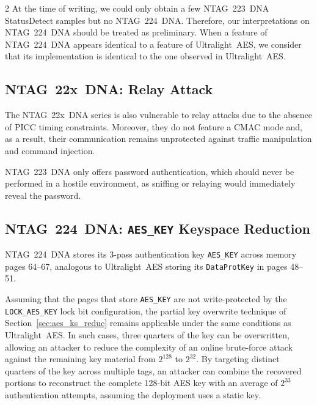 \documentclass[10pt,letterpaper]{article}
\begin{document}
\begin{multicols}{2}
At the time of writing, we could only obtain a few NTAG~223~DNA StatusDetect samples but no NTAG~224~DNA. Therefore, our interpretations on NTAG~224~DNA should be treated as preliminary. When a feature of NTAG~224~DNA appears identical to a feature of Ultralight~AES, we consider that its implementation is identical to the one observed in Ultralight~AES.

\subsection{NTAG~22x~DNA: Relay Attack}

The NTAG~22x~DNA series is also vulnerable to relay attacks due to the absence of PICC timing constraints. Moreover, they do not feature a CMAC mode and, as a result, their communication remains unprotected against traffic manipulation and command injection.

NTAG~223~DNA only offers password authentication, which should never be performed in a hostile environment, as sniffing or relaying would immediately reveal the password.

\subsection{NTAG~224~DNA: \texttt{AES\_KEY} Keyspace Reduction}

NTAG~224~DNA stores its 3-pass authentication key \texttt{AES\_KEY} across memory pages 64--67, analogous to Ultralight~AES storing its \texttt{DataProtKey} in pages 48--51.

Assuming that the pages that store \texttt{AES\_KEY} are not write-protected by the \texttt{LOCK\_AES\_KEY} lock bit configuration, the partial key overwrite technique of Section~\ref{sec:aes_ks_reduc} remains applicable under the same conditions as Ultralight~AES. In such cases, three quarters of the key can be overwritten, allowing an attacker to reduce the complexity of an online brute-force attack against the remaining key material from \(2^{128}\) to \(2^{32}\).
By targeting distinct quarters of the key across multiple tags, an attacker can combine the recovered portions to reconstruct the complete 128-bit AES key with an average of \(2^{33}\) authentication attempts, assuming the deployment uses a static key.


\end{multicols}
\end{document}
